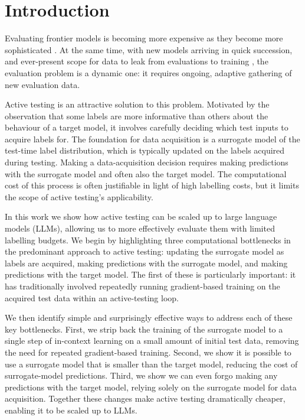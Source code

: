 \section{Introduction}

Evaluating frontier models is becoming more expensive as they become more sophisticated \citep{burden2024evaluating,openai2023gpt4}.
At the same time, with new models arriving in quick succession, and ever-present scope for data to leak from evaluations to training \citep{ganguli2023challenges}, the evaluation problem is a dynamic one: it requires ongoing, adaptive gathering of new evaluation data.

Active testing \citep{kossen2021active,kossen2022active} is an attractive solution to this problem.
Motivated by the observation that some labels are more informative than others about the behaviour of a target model, it involves carefully deciding which test inputs to acquire labels for.
The foundation for data acquisition is a surrogate model of the test-time label distribution, which is typically updated on the labels acquired during testing.
Making a data-acquisition decision requires making predictions with the surrogate model and often also the target model.
The computational cost of this process is often justifiable in light of high labelling costs, but it limits the scope of active testing's applicability.

In this work we show how active testing can be scaled up to large language models (LLMs), allowing us to more effectively evaluate them with limited labelling budgets.
We begin by highlighting three computational bottlenecks in the predominant approach to active testing: updating the surrogate model as labels are acquired, making predictions with the surrogate model, and making predictions with the target model.
The first of these is particularly important: it has traditionally involved repeatedly running gradient-based training on the acquired test data within an active-testing loop.





We then identify simple and surprisingly effective ways to address each of these key bottlenecks.
First, we strip back the training of the surrogate model to a single step of in-context learning \citep{brown2020language} on a small amount of initial test data, removing the need for repeated gradient-based training.
Second, we show it is possible to use a surrogate model that is smaller than the target model, reducing the cost of surrogate-model predictions.
Third, we show we can even forgo making any predictions with the target model, relying solely on the surrogate model for data acquisition.
Together these changes make active testing dramatically cheaper, enabling it to be scaled up to LLMs.

